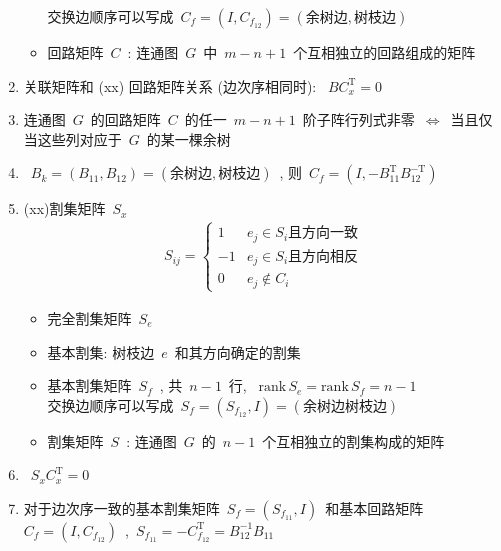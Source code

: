 \documentclass[11pt,a4paper]{article}%
\renewcommand{\[}{~$}
\renewcommand{\]}{$~}%
\newcommand{\rank}{\mathrm{rank}\,}
\begin{document}
\begin{enumerate}
\begin{itemize}
	 	 	交换边顺序可以写成\[C_f = (I, C_{f_{12}} ) = (\mbox{余树边}, \mbox{树枝边})\]
	 	 \item 回路矩阵\[C\]: 连通图\[G\]中\[m-n+1\]个互相独立的回路组成的矩阵
	 	\end{itemize}
 	 \item 关联矩阵和 (xx) 回路矩阵关系 (边次序相同时): \[BC^{\mathrm T}_x = 0\]
 	 \item 连通图\[G\]的回路矩阵\[C\]的任一\[m-n+1\]阶子阵行列式非零\[\Leftrightarrow\]当且仅当这些列对应于\[G\]的某一棵余树
 	 \item \[B_k = (B_{11} ,B_{12}) = (\mbox{余树边},\mbox{树枝边})\], 则\[C_{f} = (I ,-B_{11}^\mathrm{T} B_{12}^{-\mathrm T})\]
 	 \item (xx)割集矩阵\[S_x\]
 	 	\begin{align*}
	 	 S_{ij} = \left\{\begin{array}{rr}
	 	  1 & e_j\in S_i \mbox{且方向一致}\\
	 	  -1 & e_j\in S_i \mbox{且方向相反}\\
	 	  0 & e_j \notin C_i
	 	 \end{array}\right.
	 	\end{align*}
	 	\begin{itemize}
	 	 \item 完全割集矩阵\[S_e\]
	 	 \item 基本割集: 树枝边\[e\]和其方向确定的割集
	 	 \item 基本割集矩阵\[S_f\], 共\[n-1\]行, \[\rank S_e = \rank S_f = n-1\]\\
	 	 	交换边顺序可以写成\[S_f = (S_{f_{12}}, I ) = (\mbox{余树边} \mbox{树枝边})\]
	 	 \item 割集矩阵\[S\]: 连通图\[G\]的\[n-1\]个互相独立的割集构成的矩阵
	 	\end{itemize}
	 \item \[S_x C_x^{\mathrm T} = 0\]
	 \item 对于边次序一致的基本割集矩阵\[S_f = (S_{f_{11}},I)\]和基本回路矩阵\[C_f = (I,C_{f_{12}})\],\[S_{f_{11}} = - C_{f_{12}}^{\mathrm T} = B_{12}^{-1}B_{11}\]
	\end{enumerate}
	
\end{document}
